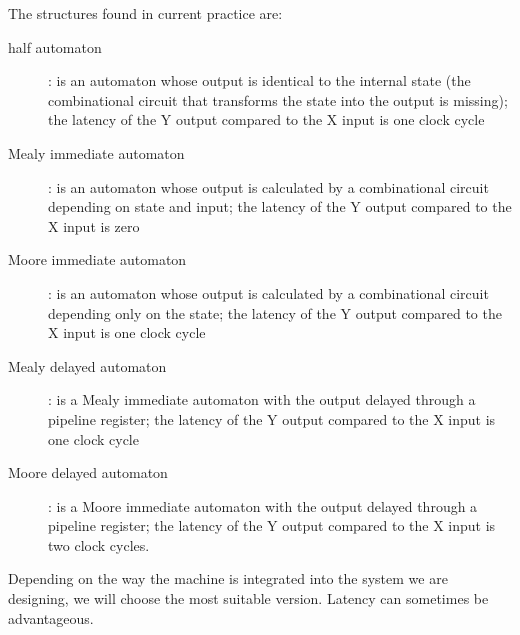 The structures found in current practice are:
\begin{description}
    \item[half automaton]: is an automaton whose output is identical to the internal state (the combinational circuit that transforms the state into the output is missing); the latency of the Y output compared to the X input is one clock cycle 

    \item[Mealy immediate automaton]: is an automaton whose output is calculated by a combinational circuit depending on state and input; the latency of the Y output compared to the X input is zero
    \item[Moore immediate automaton]: is an automaton whose output is calculated by a combinational circuit depending only on the state; the latency of the Y output compared to the X input is one clock cycle
    \item[Mealy delayed automaton]: is a Mealy immediate automaton with the output delayed through a pipeline register; the latency of the Y output compared to the X input is one clock cycle

    
    \item[Moore delayed automaton]: is a Moore immediate automaton with the output delayed through a pipeline register; the latency of the Y output compared to the X input is two clock cycles.
\end{description}
Depending on the way the machine is integrated into the system we are designing, we will choose the most suitable version. Latency can sometimes be advantageous.




